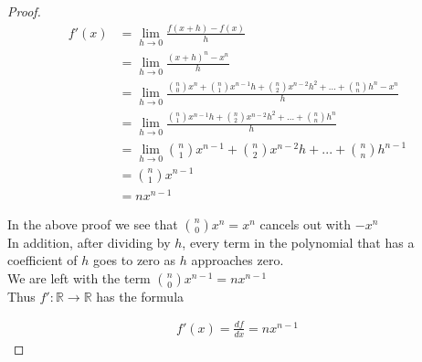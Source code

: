 \documentclass{article}
\begin{document}
\begin{proof}
\begin{align*}
f'(x) &= \lim_{h \to 0} \frac{\displaystyle f(x+h) - f(x)}{\displaystyle h} \\
&= \lim_{h \to 0} \frac{\displaystyle (x+h)^n - x^n}{\displaystyle h} \\
&= \lim_{h \to 0} \frac{\displaystyle \binom{n}{0} x^{n} + \binom{n}{1} x^{n-1} h + \binom{n}{2} x^{n-2} h^2 + ... + \binom{n}{n} h^n - x^n}{\displaystyle h} \\
&= \lim_{h \to 0} \frac{\displaystyle \binom{n}{1} x^{n-1} h + \binom{n}{2} x^{n-2} h^2 + ... + \binom{n}{n} h^n}{\displaystyle h} \\
&= \lim_{h \to 0} \binom{n}{1} x^{n-1} + \binom{n}{2} x^{n-2} h + ... + \binom{n}{n} h^{n-1} \\
&= \binom{n}{1} x^{n-1} \\
&= nx^{n-1}
\end{align*}

In the above proof we see that $\displaystyle \binom{n}{0} x^{n} = x^{n}$ cancels out with $-x^{n}$ \\

In addition, after dividing by $h$, every term in the polynomial that has a coefficient of $h$ goes to zero as $h$ approaches zero. \\

We are left with the term $\displaystyle \binom{n}{0} x^{n-1} = nx^{n-1}$ \\

Thus $f' : \mathbb{R} \to \mathbb{R}$ has the formula

\begin{align*}
f'(x) = \frac{df}{dx} = nx^{n-1}
\end{align*}

\end{proof}
\end{document}
